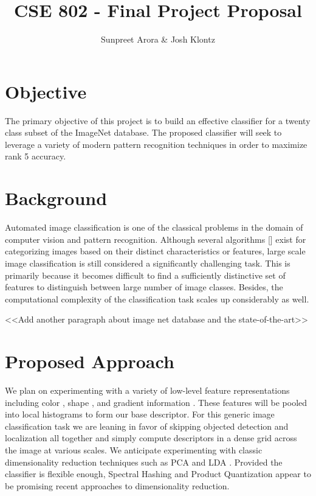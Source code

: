 \documentclass[12pt]{article}
\begin{document}
 
\title{CSE 802 - Final Project Proposal}
\author{Sunpreet Arora \& Josh Klontz\\
}
 
\maketitle

\section{Objective}
The primary objective of this project is to build an effective classifier for a twenty class subset of the ImageNet \cite{imagenet} database. 
The proposed classifier will seek to leverage a variety of modern pattern recognition techniques in order to maximize rank 5 accuracy.

\section{Background}
Automated image classification is one of the classical problems in the domain of computer vision and pattern recognition. Although several algorithms [] exist for categorizing images based on their distinct characteristics or features, large scale image classification is still considered a significantly challenging task. This is primarily because it becomes difficult to find a sufficiently distinctive set of features to distinguish between large number of image classes. Besides, the computational complexity of the classification task scales up considerably as well. 

<<Add another paragraph about image net database and the state-of-the-art>>

\section{Proposed Approach}
We plan on experimenting with a variety of low-level feature representations including color \cite{sande10}, shape \cite{ahonen06}, and gradient information \cite{lowe04,dalal05}.
These features will be pooled into local histograms to form our base descriptor.
For this generic image classification task we are leaning in favor of skipping objected detection and localization all together and simply compute descriptors in a dense grid across the image at various scales.
We anticipate experimenting with classic dimensionality reduction techniques such as PCA \cite{turk91} and LDA \cite{belhumeur97}.
Provided the classifier is flexible enough, Spectral Hashing \cite{weiss2008} and Product Quantization \cite{jegou2011} appear to be promising recent approaches to dimensionality reduction.



\end{document}
